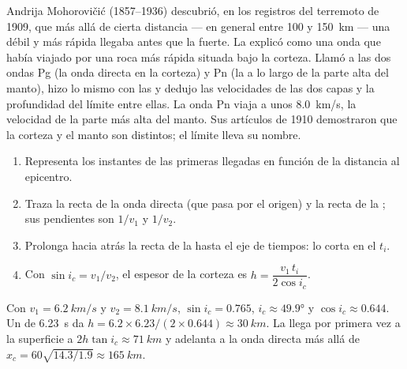\begin{history}
Andrija Mohorovičić (1857--1936) descubrió, en los registros del terremoto de
1909, que más allá de cierta distancia --- en general entre 100 y
\qty{150}{km} --- una  débil y más rápida llegaba antes que la 
fuerte. La explicó como una onda que había viajado por una roca más rápida
situada bajo la corteza. Llamó a las dos ondas Pg (la onda directa en la
corteza) y Pn (la  a lo largo de la parte alta del manto), hizo
lo mismo con las  y dedujo las velocidades de las dos capas y la
profundidad del límite entre ellas. La onda Pn viaja a unos \qty{8.0}{km/s},
la velocidad de la parte más alta del manto. Sus artículos de 1910 demostraron
que la corteza y el manto son distintos; el límite lleva su nombre.
\end{history}

\begin{method}\label{met:g11:seismic-structure:moho}
\begin{enumerate}
  \item Representa los instantes de las primeras llegadas en función de la
        distancia al epicentro.
  \item Traza la recta de la onda directa (que pasa por el origen) y la recta
        de la ; sus pendientes son $1/v_1$ y $1/v_2$.
  \item Prolonga hacia atrás la recta de la  hasta el eje de
        tiempos: lo corta en el  $t_i$.
  \item Con $\sin i_c = v_1/v_2$, el espesor de la corteza es
        $h = \dfrac{v_1\,t_i}{2\cos i_c}$.
\end{enumerate}
\end{method}

\begin{example}\label{ex:g11:seismic-structure:moho}
Con $v_1 = \qty{6.2}{km/s}$ y $v_2 = \qty{8.1}{km/s}$, $\sin i_c = 0.765$,
$i_c \approx \ang{49.9}$ y $\cos i_c \approx 0.644$. Un  de \qty{6.23}{s} da $h = 6.2 \times 6.23/(2 \times 0.644) \approx
\qty{30}{km}$. La  llega por primera vez a la superficie a
$2h\tan i_c \approx \qty{71}{km}$ y adelanta a la onda directa más allá de
$x_c = 60\sqrt{14.3/1.9} \approx \qty{165}{km}$.
\end{example}

